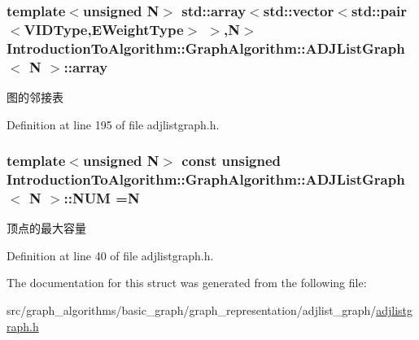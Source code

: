 \subsubsection[{array}]{\setlength{\rightskip}{0pt plus 5cm}template$<$unsigned N$>$ std\+::array$<$std\+::vector$<$std\+::pair$<${\bf V\+I\+D\+Type},{\bf E\+Weight\+Type}$>$ $>$,N$>$ {\bf Introduction\+To\+Algorithm\+::\+Graph\+Algorithm\+::\+A\+D\+J\+List\+Graph}$<$ N $>$\+::array}\label{struct_introduction_to_algorithm_1_1_graph_algorithm_1_1_a_d_j_list_graph_ac02abc1501b57a7963ec1b388150429e}
图的邻接表 

Definition at line 195 of file adjlistgraph.\+h.

\hypertarget{struct_introduction_to_algorithm_1_1_graph_algorithm_1_1_a_d_j_list_graph_aaff3f1cdb9f184027dd3f057d4a5b4bc}{}
\subsubsection[{N\+U\+M}]{\setlength{\rightskip}{0pt plus 5cm}template$<$unsigned N$>$ const unsigned {\bf Introduction\+To\+Algorithm\+::\+Graph\+Algorithm\+::\+A\+D\+J\+List\+Graph}$<$ N $>$\+::N\+U\+M =N\hspace{0.3cm}{\ttfamily [static]}}\label{struct_introduction_to_algorithm_1_1_graph_algorithm_1_1_a_d_j_list_graph_aaff3f1cdb9f184027dd3f057d4a5b4bc}
顶点的最大容量 

Definition at line 40 of file adjlistgraph.\+h.



The documentation for this struct was generated from the following file\+:\begin{DoxyCompactItemize}
\item 
src/graph\+\_\+algorithms/basic\+\_\+graph/graph\+\_\+representation/adjlist\+\_\+graph/\hyperlink{adjlistgraph_8h}{adjlistgraph.\+h}\end{DoxyCompactItemize}
